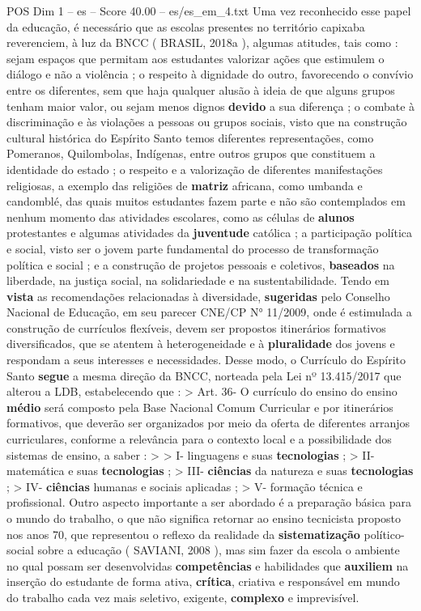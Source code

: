 \begin{textsample}{POS Dim 1 – es – Score 40.00 – es/es\_em\_4.txt}
Uma vez reconhecido esse papel da educação, é necessário que as escolas presentes no território capixaba reverenciem, à luz da BNCC ( BRASIL, 2018a ), algumas atitudes, tais como : sejam espaços que permitam aos estudantes valorizar ações que estimulem o diálogo e não a violência ; o respeito à dignidade do outro, favorecendo o convívio entre os diferentes, sem que haja qualquer alusão à ideia de que alguns grupos tenham maior valor, ou sejam menos dignos \textbf{devido} a sua diferença ; o combate à discriminação e às violações a pessoas ou grupos sociais, visto que na construção cultural histórica do Espírito Santo temos diferentes representações, como Pomeranos, Quilombolas, Indígenas, entre outros grupos que constituem a identidade do estado ; o respeito e a valorização de diferentes manifestações religiosas, a exemplo das religiões de \textbf{matriz} africana, como umbanda e candomblé, das quais muitos estudantes fazem parte e não são contemplados em nenhum momento das atividades escolares, como as células de \textbf{alunos} protestantes e algumas atividades da \textbf{juventude} católica ; a participação política e social, visto ser o jovem parte fundamental do processo de transformação política e social ; e a construção de projetos pessoais e coletivos, \textbf{baseados} na liberdade, na justiça social, na solidariedade e na sustentabilidade.
Tendo em \textbf{vista} as recomendações relacionadas à diversidade, \textbf{sugeridas} pelo Conselho Nacional de Educação, em seu parecer CNE/CP N{\EmojiFont °} 11/2009, onde é estimulada a construção de currículos flexíveis, devem ser propostos itinerários formativos diversificados, que se atentem à heterogeneidade e à \textbf{pluralidade} dos jovens e respondam a seus interesses e necessidades.
Desse modo, o Currículo do Espírito Santo \textbf{segue} a mesma direção da BNCC, norteada pela Lei nº 13.415/2017 que alterou a LDB, estabelecendo que : > Art. 36- O currículo do ensino do ensino \textbf{médio} será composto pela Base Nacional Comum Curricular e por itinerários formativos, que deverão ser organizados por meio da oferta de diferentes arranjos curriculares, conforme a relevância para o contexto local e a possibilidade dos sistemas de ensino, a saber : > > I- linguagens e suas \textbf{tecnologias} ; > II- matemática e suas \textbf{tecnologias} ; > III- \textbf{ciências} da natureza e suas \textbf{tecnologias} ; > IV- \textbf{ciências} humanas e sociais aplicadas ; > V- formação técnica e profissional.
Outro aspecto importante a ser abordado é a preparação básica para o mundo do trabalho, o que não significa retornar ao ensino tecnicista proposto nos anos 70, que representou o reflexo da realidade da \textbf{sistematização} político-social sobre a educação ( SAVIANI, 2008 ), mas sim fazer da escola o ambiente no qual possam ser desenvolvidas \textbf{competências} e habilidades que \textbf{auxiliem} na inserção do estudante de forma ativa, \textbf{crítica}, criativa e responsável em mundo do trabalho cada vez mais seletivo, exigente, \textbf{complexo} e imprevisível.

\end{textsample}
